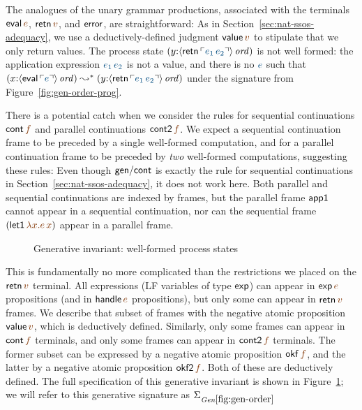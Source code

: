 The analogues of the unary grammar productions, associated with the
terminals ${\sf eval}\,\lf{e}$, ${\sf retn}\,\lf{v}$, and ${\sf
  error}$, are straightforward:
%
\smallskip
{}
\smallskip 
%
As in Section~\ref{sec:nat-ssos-adequacy}, we use a
deductively-defined judgment ${\sf value}\,\lf{v}$ to stipulate that
we only return values. The process state $(y{:}\istrue{\susp{{\sf
      retn}\,\interp{e_1\,e_2}}})$ is not well formed: the
application expression $\obj{e_1\,e_2}$ is not a value, and
there is no $\obj{e}$ such that $(x{:}\istrue{\susp{{\sf
      eval}\,\interp{e}}}) \leadsto^* (y{:}\istrue{\susp{{\sf
      retn}\,\interp{e_1\,e_2}}})$ under the signature from
Figure~\ref{fig:gen-order-prog}.

There is a potential catch when we consider the rules for sequential
continuations ${\sf cont}\,\lf{f}$ and parallel continuations ${\sf
  cont2}\,\lf{f}$. We expect a sequential continuation frame to be
preceded by a single well-formed computation, and for a parallel
continuation frame to be preceded by {\it two} well-formed
computations, suggesting these rules:
%
\smallskip
{}
\smallskip 
%
Even though ${\sf gen/cont}$ is exactly the rule for sequential
continuations in Section~\ref{sec:nat-ssos-adequacy}, it does not work
here.  Both parallel and sequential continuations are indexed by
frames, but the parallel frame ${\sf app1}$ cannot appear in a
sequential continuation, nor can the sequential frame $({\sf
  let1}\,\lf{\lambda x.e\,x})$ appear in a parallel frame. 

\begin{figure}[tp]
\caption{Generative invariant: well-formed process states}
\label{fig:gen-order} 
\end{figure}

\newcommand{\siggenorder}{\Sigma_{\it Gen\ref{fig:gen-order}}}
\newcommand{\siggenordertp}{\Sigma_{\it Gen\ref{fig:gen-ordertp}}}
\newcommand{\siggendests}{\Sigma_{\it Gen\ref{fig:gen-destinations}}}

This is fundamentally no more complicated than the restrictions we
placed on the ${\sf retn}\,\lf{v}$ terminal. All expressions (LF
variables of type ${\sf exp}$) can appear in ${\sf exp}\,\lf{e}$
propositions (and in ${\sf handle}\,\lf{e}$ propositions), but only
some can appear in ${\sf retn}\,\lf{v}$ frames. We describe that
subset of frames with the negative atomic proposition ${\sf
  value}\,\lf{v}$, which is deductively defined. Similarly, only some
frames can appear in ${\sf cont}\,\lf{f}$ terminals, and only some
frames can appear in ${\sf cont2}\,\lf{f}$ terminals. The former subset
can be expressed by a negative atomic proposition ${\sf okf}\,\lf{f}$,
and the latter by a negative atomic proposition ${\sf okf2}\,\lf{f}$.
Both of these are deductively defined.  The full specification of this
generative invariant is shown in Figure~\ref{fig:gen-order}; we will
refer to this generative signature as $\siggenorder$

